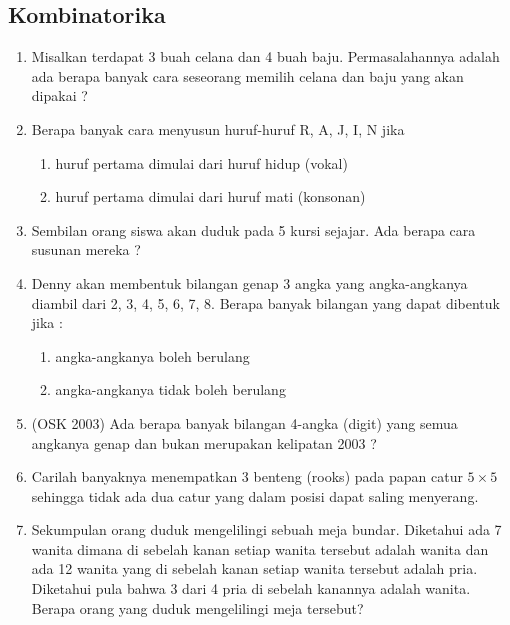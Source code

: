 \documentclass[11pt]{scrartcl}
\begin{document}
    \subsection{Kombinatorika}
        \begin{enumerate}
         \item Misalkan terdapat 3 buah celana dan 4 buah baju. Permasalahannya adalah ada berapa banyak cara 
        seseorang memilih celana dan baju yang akan dipakai ?
        
            \item Berapa banyak cara menyusun huruf-huruf R, A, J, I, N jika 
        \begin{enumerate}
            \item huruf pertama dimulai dari huruf hidup (vokal) 
            \item huruf pertama dimulai dari huruf mati (konsonan) 
        \end{enumerate}
        
            \item Sembilan orang siswa akan duduk pada 5 kursi sejajar. Ada berapa cara susunan mereka ? 
            
            \item Denny akan membentuk bilangan genap 3 angka yang angka-angkanya diambil dari 2, 3, 4, 5, 6, 7, 8. 
        Berapa banyak bilangan yang dapat dibentuk jika : 
            \begin{enumerate}
                \item angka-angkanya boleh berulang 
        \item angka-angkanya tidak boleh berulang
            \end{enumerate}
            
            \item (OSK 2003) Ada berapa banyak bilangan 4-angka (digit) yang semua angkanya genap dan bukan 
        merupakan kelipatan 2003 ?
            \item  Carilah banyaknya menempatkan 3 benteng (rooks) pada papan catur $5 \times 5$ sehingga
        tidak ada dua catur yang dalam posisi dapat saling menyerang.
        
            \item Sekumpulan orang duduk mengelilingi sebuah meja bundar. Diketahui ada 7 wanita
        dimana di sebelah kanan setiap wanita tersebut adalah wanita dan ada 12 wanita yang di
        sebelah kanan setiap wanita tersebut adalah pria. Diketahui pula bahwa 3 dari 4 pria di
        sebelah kanannya adalah wanita. Berapa orang yang duduk mengelilingi meja tersebut?
        

\end{enumerate}
\end{document}
